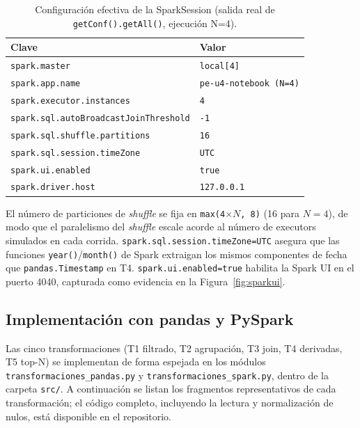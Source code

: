 \documentclass[11pt,a4paper]{article}
\begin{document}
\begin{table}[htbp]
\centering
\caption{Configuraci\'on efectiva de la SparkSession (salida real de \texttt{getConf().getAll()}, ejecuci\'on N=4).}
\label{tab:sparkconf}
\begin{tabular}{@{}ll@{}}
\toprule
\textbf{Clave} & \textbf{Valor} \\
\midrule
\texttt{spark.master} & \texttt{local[4]} \\
\texttt{spark.app.name} & \texttt{pe-u4-notebook (N=4)} \\
\texttt{spark.executor.instances} & \texttt{4} \\
\texttt{spark.sql.autoBroadcastJoinThreshold} & \texttt{-1} \\
\texttt{spark.sql.shuffle.partitions} & \texttt{16} \\
\texttt{spark.sql.session.timeZone} & \texttt{UTC} \\
\texttt{spark.ui.enabled} & \texttt{true} \\
\texttt{spark.driver.host} & \texttt{127.0.0.1} \\
\bottomrule
\end{tabular}
\end{table}

El n\'umero de particiones de \emph{shuffle} se fija en
\texttt{max(4$\times N$, 8)} (16 para $N=4$), de modo que el paralelismo del
\emph{shuffle} escale acorde al n\'umero de executors simulados en cada
corrida. \texttt{spark.sql.session.timeZone=UTC} asegura que las funciones
\texttt{year()}/\texttt{month()} de Spark extraigan los mismos componentes de
fecha que \texttt{pandas.Timestamp} en T4. \texttt{spark.ui.enabled=true}
habilita la Spark UI en el puerto 4040, capturada como evidencia en la
Figura~\ref{fig:sparkui}.

\subsection{Implementaci\'on con pandas y PySpark}
\label{sec:implementacion}

\begin{sloppypar}
Las cinco transformaciones (T1 filtrado, T2 agrupaci\'on, T3 join, T4
derivadas, T5 top-N) se implementan de forma espejada en los m\'odulos
\texttt{transformaciones\_}\allowbreak\texttt{pandas.py} y
\texttt{transformaciones\_}\allowbreak\texttt{spark.py}, dentro de la carpeta
\texttt{src/}. A continuaci\'on se listan los
fragmentos representativos de cada transformaci\'on; el c\'odigo completo,
incluyendo la lectura y normalizaci\'on de nulos, est\'a disponible en el
repositorio.
\end{sloppypar}
\end{document}
